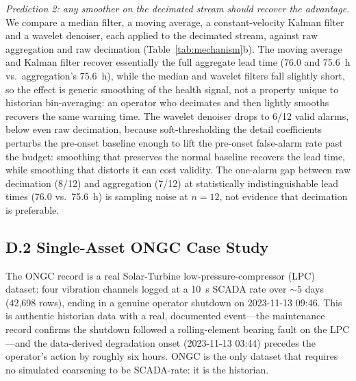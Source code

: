 \documentclass[IJPHM, 2026, 0]{PHMSociety}
\begin{document}
\emph{Prediction 2: any smoother on the decimated stream should recover the advantage.} We compare a median filter, a moving average, a constant-velocity Kalman filter and a wavelet denoiser, each applied to the decimated stream, against raw aggregation and raw decimation (Table~\ref{tab:mechanism}b). The moving average and Kalman filter recover essentially the full aggregate lead time (76.0 and 75.6~h vs.\ aggregation's 75.6~h), while the median and wavelet filters fall slightly short, so the effect is generic smoothing of the health signal, not a property unique to historian bin-averaging: an operator who decimates and then lightly smooths recovers the same warning time. The wavelet denoiser drops to 6/12 valid alarms, below even raw decimation, because soft-thresholding the detail coefficients perturbs the pre-onset baseline enough to lift the pre-onset false-alarm rate past the budget: smoothing that preserves the normal baseline recovers the lead time, while smoothing that distorts it can cost validity. The one-alarm gap between raw decimation (8/12) and aggregation (7/12) at statistically indistinguishable lead times (76.0 vs.\ 75.6~h) is sampling noise at $n=12$, not evidence that decimation is preferable.




\subsection*{D.2 Single-Asset ONGC Case Study}
The ONGC record is a real Solar-Turbine low-pressure-compressor (LPC) dataset: four vibration channels logged at a 10~s SCADA rate over ${\sim}5$ days (42,698 rows), ending in a genuine operator shutdown on 2023-11-13 09:46. This is authentic historian data with a real, documented event---the maintenance record confirms the shutdown followed a rolling-element bearing fault on the LPC---and the data-derived degradation onset (2023-11-13 03:44) precedes the operator's action by roughly six hours. ONGC is the only dataset that requires no simulated coarsening to be SCADA-rate: it is the historian.
\end{document}
